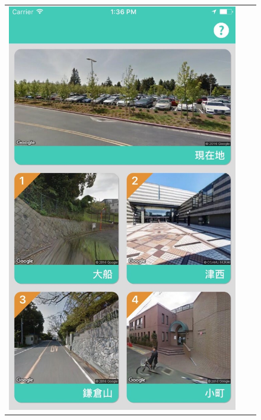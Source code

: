 \documentclass[a4paper]{jsarticle}
\begin{document}
\fifigure
\begin{figure}[H]
  \begin{center}
    \begin{tabular}{ccc}
    \begin{minipage}{0.3\hsize}
	\includegraphics[width=\hsize]{./images/mbs_top.jpg}
    \end{minipage}
    &
    \begin{minipage}{0.3\hsize}

\end{minipage}
\end{tabular}
\end{center}
\end{figure}
\end{document}
